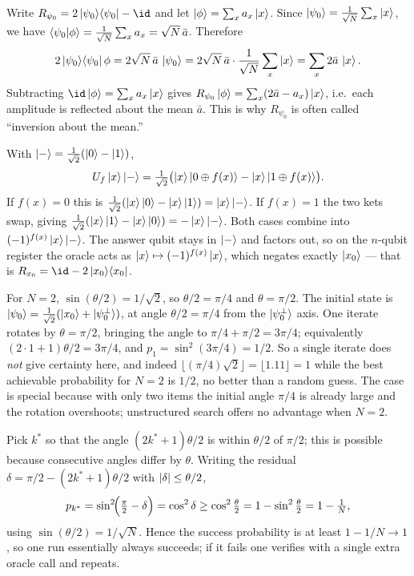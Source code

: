 \begin{solution}
Write $R_{\psi_0}=2\ketbra{\psi_0}{\psi_0}-\id$ and let $\ket{\phi}=\sum_x a_x\ket{x}$.
Since $\ket{\psi_0}=\tfrac1{\sqrt N}\sum_x\ket{x}$, we have
$\braket{\psi_0|\phi}=\tfrac1{\sqrt N}\sum_x a_x=\sqrt N\,\bar a$. Therefore
\[
  2\ket{\psi_0}\!\bra{\psi_0}\phi
    =2\sqrt N\,\bar a\,\ket{\psi_0}
    =2\sqrt N\,\bar a\cdot\frac1{\sqrt N}\sum_x\ket{x}
    =\sum_x 2\bar a\,\ket{x}.
\]
Subtracting $\id\ket{\phi}=\sum_x a_x\ket{x}$ gives
$R_{\psi_0}\ket{\phi}=\sum_x(2\bar a-a_x)\ket{x}$, i.e.\ each amplitude is reflected
about the mean $\bar a$. This is why $R_{\psi_0}$ is often called ``inversion about
the mean.''
\end{solution}

\begin{solution}
With $\ket{-}=\tfrac1{\sqrt2}(\ket0-\ket1)$,
\[
  U_f\ket{x}\ket{-}
   =\tfrac1{\sqrt2}\bigl(\ket{x}\ket{0\oplus f(x)}-\ket{x}\ket{1\oplus f(x)}\bigr).
\]
If $f(x)=0$ this is $\tfrac1{\sqrt2}(\ket{x}\ket0-\ket{x}\ket1)=\ket{x}\ket{-}$. If
$f(x)=1$ the two kets swap, giving
$\tfrac1{\sqrt2}(\ket{x}\ket1-\ket{x}\ket0)=-\ket{x}\ket{-}$. Both cases combine into
$(-1)^{f(x)}\ket{x}\ket{-}$. The answer qubit stays in $\ket{-}$ and factors out, so
on the $n$-qubit register the oracle acts as $\ket{x}\mapsto(-1)^{f(x)}\ket{x}$,
which negates exactly $\ket{x_0}$ --- that is $R_{x_0}=\id-2\ketbra{x_0}{x_0}$.
\end{solution}

\begin{solution}
For $N=2$, $\sin(\theta/2)=1/\sqrt2$, so $\theta/2=\pi/4$ and $\theta=\pi/2$. The
initial state is $\ket{\psi_0}=\tfrac1{\sqrt2}(\ket{x_0}+\ket{\psi_0^{\perp}})$, at
angle $\theta/2=\pi/4$ from the $\ket{\psi_0^{\perp}}$ axis. One iterate rotates by
$\theta=\pi/2$, bringing the angle to $\pi/4+\pi/2=3\pi/4$; equivalently
$(2\cdot1+1)\theta/2=3\pi/4$, and $p_1=\sin^2(3\pi/4)=1/2$. So a single iterate does
\emph{not} give certainty here, and indeed
$\lfloor(\pi/4)\sqrt2\rfloor=\lfloor1.11\rfloor=1$ while the best achievable
probability for $N=2$ is $1/2$, no better than a random guess. The case is special
because with only two items the initial angle $\pi/4$ is already large and the
rotation overshoots; unstructured search offers no advantage when $N=2$.
\end{solution}

\begin{solution}
Pick $k^{\ast}$ so that the angle $(2k^{\ast}+1)\theta/2$ is within $\theta/2$ of
$\pi/2$; this is possible because consecutive angles differ by $\theta$. Writing the
residual $\delta=\pi/2-(2k^{\ast}+1)\theta/2$ with $\lvert\delta\rvert\le\theta/2$,
\[
  p_{k^{\ast}}=\sin^2\!\Bigl(\tfrac\pi2-\delta\Bigr)=\cos^2\delta\ge\cos^2\tfrac\theta2
   =1-\sin^2\tfrac\theta2=1-\tfrac1N,
\]
using $\sin(\theta/2)=1/\sqrt N$. Hence the success probability is at least
$1-1/N\to1$, so one run essentially always succeeds; if it fails one verifies with a
single extra oracle call and repeats.
\end{solution}

